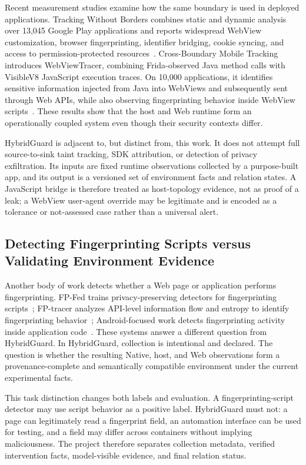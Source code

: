 Recent measurement studies examine how the same boundary is used in deployed applications. Tracking Without Borders combines static and dynamic analysis over 13,045 Google Play applications and reports widespread WebView customization, browser fingerprinting, identifier bridging, cookie syncing, and access to permission-protected resources~\cite{weerasekara2025tracking}. Cross-Boundary Mobile Tracking introduces WebViewTracer, combining Frida-observed Java method calls with VisibleV8 JavaScript execution traces. On 10,000 applications, it identifies sensitive information injected from Java into WebViews and subsequently sent through Web APIs, while also observing fingerprinting behavior inside WebView scripts~\cite{datta2026crossboundary}. These results show that the host and Web runtime form an operationally coupled system even though their security contexts differ.

HybridGuard is adjacent to, but distinct from, this work. It does not attempt full source-to-sink taint tracking, SDK attribution, or detection of privacy exfiltration. Its inputs are fixed runtime observations collected by a purpose-built app, and its output is a versioned set of environment facts and relation states. A JavaScript bridge is therefore treated as host-topology evidence, not as proof of a leak; a WebView user-agent override may be legitimate and is encoded as a tolerance or not-assessed case rather than a universal alert.

\subsection{Detecting Fingerprinting Scripts versus Validating Environment Evidence}

Another body of work detects whether a Web page or application performs fingerprinting. FP-Fed trains privacy-preserving detectors for fingerprinting scripts~\cite{annamalai2024fpfed}; FP-tracer analyzes API-level information flow and entropy to identify fingerprinting behavior~\cite{boussaha2024fptracer}; Android-focused work detects fingerprinting activity inside application code~\cite{heid2024androidfp}. These systems answer a different question from HybridGuard. In HybridGuard, collection is intentional and declared. The question is whether the resulting Native, host, and Web observations form a provenance-complete and semantically compatible environment under the current experimental facts.

This task distinction changes both labels and evaluation. A fingerprinting-script detector may use script behavior as a positive label. HybridGuard must not: a page can legitimately read a fingerprint field, an automation interface can be used for testing, and a field may differ across containers without implying maliciousness. The project therefore separates collection metadata, verified intervention facts, model-visible evidence, and final relation status.

